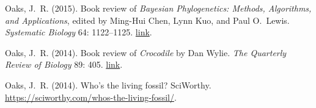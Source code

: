 \myHangIndent
Oaks, J.\ R.
(2015).
Book review of \emph{Bayesian Phylogenetics: Methods, Algorithms, and Applications}, edited by Ming-Hui Chen, Lynn Kuo, and Paul O.\ Lewis.
\emph{Systematic Biology} 64: 1122--1125. \href{http://dx.doi.org/doi:10.1093/sysbio/syv063}{link}.

\myHangIndent
Oaks, J.\ R.
(2014).
Book review of \emph{Crocodile} by Dan Wylie.
\emph{The Quarterly Review of Biology} 89: 405. \href{http://dx.doi.org/10.1086/678660}{link}.

\myHangIndent
Oaks, J.\ R.
(2014).
Who's the living fossil?
SciWorthy.
\href{https://sciworthy.com/whos-the-living-fossil/}{
    https://sciworthy.com/whos-the-living-fossil/}.

